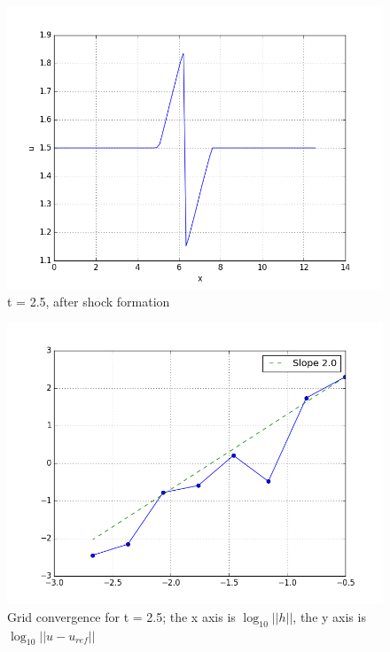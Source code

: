 \documentclass{article}
\begin{document}
\begin{figure}
	\centering
	\includegraphics[scale=0.5]{hp-sol-n100-t25}
	\caption{t = 2.5, after shock formation}
\end{figure}
 
\begin{figure}
	\centering
	\includegraphics[scale=0.5]{hp-t25-grids8}
	\caption{Grid convergence for t = 2.5; the x axis is $\log_{10}||h||$, the y axis is $\log_{10}||u-u_{ref}||$}
\end{figure}
 
\end{document}
